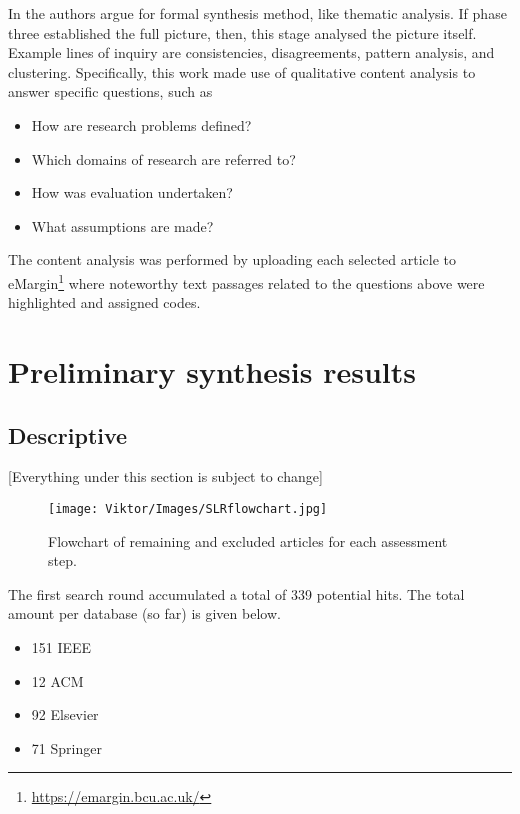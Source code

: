 \documentclass{article}
\begin{document}
\noindent In \cite[pp.~223-224]{booth2012} the authors argue for formal synthesis method, like thematic analysis. If phase three established the full picture, then, this stage analysed the picture itself. Example lines of inquiry are consistencies, disagreements, pattern analysis, and clustering\cite[pp.~223-224]{booth2012}. Specifically, this work made use of qualitative content analysis \cite{white2006} to answer specific questions, such as

\begin{itemize}
    \item How are research problems defined?
    \item Which domains of research are referred to?
    \item How was evaluation undertaken?
    \item What assumptions are made?
\end{itemize}

The content analysis was performed by uploading each selected article to eMargin\footnote{\url{https://emargin.bcu.ac.uk/}} where noteworthy text passages related to the questions above were highlighted and assigned codes.

\newpage
\section{Preliminary synthesis results}
\subsection{Descriptive}

[Everything under this section is subject to change]

\begin{figure}[h]
\centering
\texttt{[image: Viktor/Images/SLRflowchart.jpg]}
\caption{Flowchart of remaining and excluded articles for each assessment step.}
\label{fig:SLRFlow}
\end{figure}

\noindent The first search round accumulated a total of 339 potential hits. The total amount per database (so far) is given below.

\begin{itemize}
    \item 151 IEEE
    \item 12 ACM
    \item 92 Elsevier
    \item 71 Springer
\end{itemize}
\end{document}
